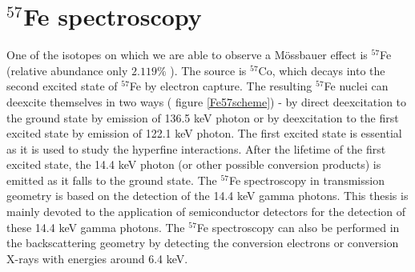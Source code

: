 \section{$^{57}$Fe spectroscopy}
One of the isotopes on which we are able to observe a Mössbauer effect is $^{57}$Fe (relative abundance only $2.119 \%$ \cite{compounds}). The source is $^{57}$Co, which decays into the second excited state of $^{57}$Fe by electron capture. The resulting $^{57}$Fe nuclei can deexcite themselves in two ways ( figure \ref{Fe57scheme}) - by direct deexcitation to the ground state by emission of 136.5 keV photon or by deexcitation to the first excited state by emission of 122.1 keV photon. The first excited state is essential as it is used to study the hyperfine interactions. After the lifetime of the first excited state, the 14.4 keV photon (or other possible conversion products) is emitted as it falls to the ground state. The $^{57}$Fe spectroscopy in transmission geometry is based on the detection of the 14.4 keV gamma photons. This thesis is mainly devoted to the application of semiconductor detectors for the detection of these 14.4 keV gamma photons. The $^{57}$Fe spectroscopy can also be performed in the backscattering geometry by detecting the conversion electrons or conversion X-rays with energies around 6.4 keV.


